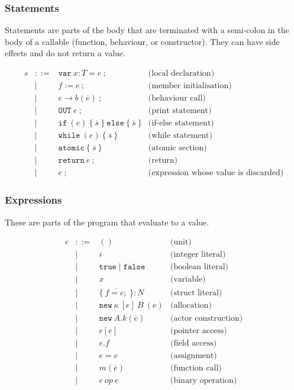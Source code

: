 \documentclass[a4paper,12pt,fleqn]{article}
\begin{document}
\subsubsection{Statements}
Statements are parts of the body that are terminated with a semi-colon in the body of a callable (function, behaviour, or constructor). They can have side effects and do not return a value.

\[
\begin{array}{lcll}
s & ::= & \mathtt{var}\ x : T = e\ ; & \text{(local declaration)} \\
  & \mid & f := e\ ; & \text{(member initialisation)} \\
  & \mid & e \to b(\overline{e})\ ; & \text{(behaviour call)} \\
  & \mid & \mathtt{OUT}\ e\ ; & \text{(print statement)} \\
  & \mid & \mathtt{if}\ (e)\ \{\ \overline{s}\ \}\ \mathtt{else}\ \{\ \overline{s}\ \} & \text{(if-else statement)} \\
  & \mid & \mathtt{while}\ (e)\ \{\ \overline{s}\ \} & \text{(while statement)} \\
  & \mid & \mathtt{atomic}\ \{\ \overline{s}\ \} & \text{(atomic section)}\\
  & \mid & \mathtt{return}\ e\ ; & \text{(return)}\\
  & \mid & e\ ; & \text{(expression whose value is discarded)}
\end{array}
\]

\subsubsection{Expressions}
These are parts of the program that evaluate to a value.

\[
\begin{array}{lcll}
e & ::= & () & \text{(unit)} \\
  & \mid & i & \text{(integer literal)} \\
  & \mid & \mathtt{true} \mid \mathtt{false} & \text{(boolean literal)} \\
  & \mid & x & \text{(variable)} \\
  & \mid & \{\ \overline{f = e;}\ \} : N & \text{(struct literal)} \\
  & \mid & \mathtt{new}\ \kappa\ [e]\ B\ (e) & \text{(allocation)} \\
  & \mid & \mathtt{new}\ A.k(\overline{e}) & \text{(actor construction)} \\
  & \mid & e[e] & \text{(pointer access)} \\
  & \mid & e.f & \text{(field access)} \\
  & \mid & e = e & \text{(assignment)} \\
  & \mid & m(\overline{e}) & \text{(function call)} \\
  & \mid & e\ \mathit{op}\ e & \text{(binary operation)}
\end{array}
\]
\end{document}
